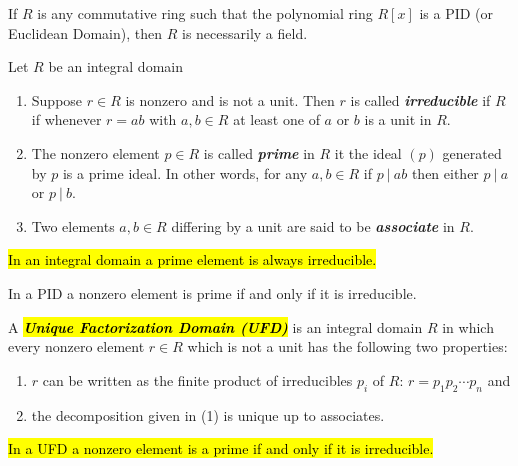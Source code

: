 \nl

\begin{cor}
If $R$ is any commutative ring such that the polynomial ring $R[x]$ is a PID (or Euclidean Domain), then $R$ is necessarily a field.
\end{cor}

\nl

\begin{defn}
Let $R$ be an integral domain
\begin{enumerate}
\item Suppose $r\in R$ is nonzero and is not a unit. Then $r$ is called \textit{\textbf{irreducible}} if $R$ if whenever $r = ab$ with $a,b\in R$ at least one of $a$ or $b$ is a unit in $R$.
\item The nonzero element $p\in R$ is called \textbf{\textit{prime}} in $R$ it the ideal $(p)$ generated by $p$ is a prime ideal. In other words, for any $a,b\in R$ if $p\ |\ ab$ then either $p\ |\ a$ or $p\ |\ b$.
\item Two elements $a,b\in R$ differing by a unit are said to be \textit{\textbf{associate}} in $R$.
\end{enumerate}
\end{defn}

\nl

\begin{prop}
\hl{In an integral domain a prime element is always irreducible.}
\end{prop}

\nl

\begin{prop}
In a PID a nonzero element is prime if and only if it is irreducible.
\end{prop}

\nl

\begin{defn}
A \hl{\textit{\textbf{Unique Factorization Domain (UFD)}}} is an integral domain $R$ in which every nonzero element $r\in R$ which is not a unit has the following two properties:
\begin{enumerate}
\item $r$ can be written as the finite product of irreducibles $p_i$ of $R$: $r = p_1p_2\cdots p_n$ and
\item the decomposition given in (1) is unique up to associates. 
\end{enumerate}
\end{defn}

\nl

\begin{prop}
\hl{In a UFD a nonzero element is a prime if and only if it is irreducible.}
\end{prop}

